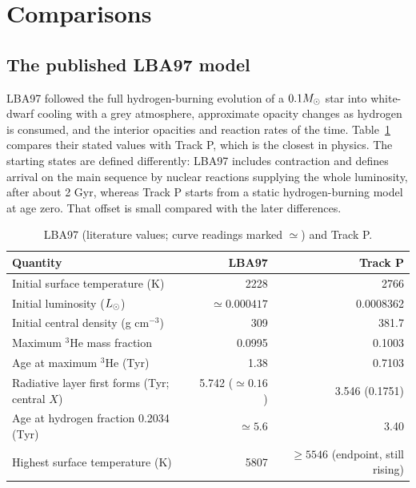 \section{Comparisons}\label{sec:comparisons}

\subsection{The published LBA97 model}
LBA97 \cite{lba97} followed the full hydrogen-burning evolution of a
$0.1M_\odot$ star into white-dwarf cooling with a grey atmosphere, approximate
opacity changes as hydrogen is consumed, and the interior opacities and
reaction rates of the time. Table~\ref{tab:lba} compares their stated
values with Track P, which is the closest in physics. The starting states
are defined differently: LBA97 includes contraction and defines arrival on
the main sequence by nuclear reactions supplying the whole luminosity, after
about 2 Gyr, whereas Track P starts from a static hydrogen-burning model at
age zero. That offset is small compared with the later differences.

\begin{table}[H]\centering\small
\caption{LBA97 (literature values; curve readings marked $\simeq$) and Track P.}\label{tab:lba}
\begin{tabular}{@{}lrr@{}}\toprule
Quantity & LBA97 & Track P \\\midrule
Initial surface temperature (K) & 2228 & 2766 \\
Initial luminosity ($L_\odot$) & $\simeq0.000417$ & 0.0008362 \\
Initial central density (g cm$^{-3}$) & 309 & 381.7 \\
Maximum $^3$He mass fraction & 0.0995 & 0.1003 \\
Age at maximum $^3$He (Tyr) & 1.38 & 0.7103 \\
Radiative layer first forms (Tyr; central $X$) & 5.742 ($\simeq0.16$) & 3.546 (0.1751) \\
Age at hydrogen fraction 0.2034 (Tyr) & $\simeq5.6$ & 3.40 \\
Highest surface temperature (K) & 5807 & $\geq5546$ (endpoint, still rising) \\\bottomrule
\end{tabular}
\end{table}

